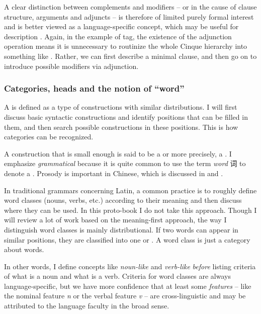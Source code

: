 \documentclass[../main.tex]{subfiles}
\begin{document}
A clear distinction between complements and modifiers -- or in the cause of clause structure, arguments and
adjuncts -- is therefore of limited purely formal interest and is better viewed as a language-specific concept, 
which may be useful for description \citep{haspelmath2014arguments}. 
Again, in the example of \ac{tag}, the existence of the adjunction operation means it is unnecessary
to routinize the whole Cinque hierarchy into something like .
Rather, we can first describe a minimal clause, and then go on to introduce possible modifiers via 
adjunction. 

\subsubsection{Categories, heads and the notion of ``word''}

A  is defined as a type of constructions with similar distributions.
I will first discuss basic syntactic constructions and identify positions that can be filled in them, 
and then search possible constructions in these positions. This is how categories can be recognized.

A construction that is small enough is said to be a  or more precisely, 
a .
I emphasize \emph{grammatical} because it is quite common to use the term \emph{word} 词 to denote 
a . Prosody is important in Chinese, which is discussed in 
 and . 

In traditional grammars concerning Latin, a common practice is to roughly define word classes (nouns, verbs, etc.) 
according to their meaning and then discuss where they can be used. 
In this proto-book I do not take this approach. Though I will review a lot of work based on the meaning-first 
approach, the way I distinguish word classes is mainly distributional. If two words can appear in similar
positions, they are classified into one  or .
A word class is just a category about words.  

In other words, I define concepts like \emph{noun-like} and \emph{verb-like} \emph{before} listing criteria of 
what is a noun and what is a verb. Criteria for word classes are always language-specific, but we have more 
confidence that at least some \emph{features} -- like the nominal feature \textit{n} or the verbal feature 
\textit{v} -- are cross-linguistic and may be attributed to the language faculty in the broad sense. 
\end{document}
